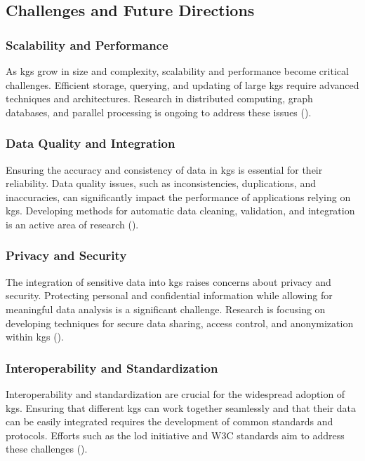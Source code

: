 \subsection*{Challenges and Future Directions}

\subsubsection*{Scalability and Performance}
As \glspl{kg} grow in size and complexity, scalability and performance become critical challenges. Efficient storage, querying, and updating of large \glspl{kg} require advanced techniques and architectures. Research in distributed computing, graph databases, and parallel processing is ongoing to address these issues (\cite{Chaudhri2022}).
 
\subsubsection*{Data Quality and Integration}

Ensuring the accuracy and consistency of data in \glspl{kg} is essential for their reliability. Data quality issues, such as inconsistencies, duplications, and inaccuracies, can significantly impact the performance of applications relying on \glspl{kg}. Developing methods for automatic data cleaning, validation, and integration is an active area of research (\cite{Paulheim2017}).

\subsubsection*{Privacy and Security}

The integration of sensitive data into \glspl{kg} raises concerns about privacy and security. Protecting personal and confidential information while allowing for meaningful data analysis is a significant challenge. Research is focusing on developing techniques for secure data sharing, access control, and anonymization within \glspl{kg} (\cite{Bonatti2017}).

\subsubsection*{Interoperability and Standardization}

Interoperability and standardization are crucial for the widespread adoption of \glspl{kg}. Ensuring that different \glspl{kg} can work together seamlessly and that their data can be easily integrated requires the development of common standards and protocols. Efforts such as the \gls{lod} initiative and W3C standards aim to address these challenges (\cite{Bizer2023}).


